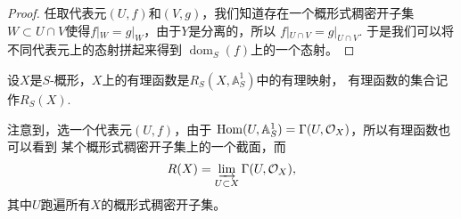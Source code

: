\begin{proof}
	任取代表元$(U,f)$和$(V,g)$，我们知道存在一个概形式稠密开子集
	$W\subset U\cap V$使得$f|_W=g|_W$，由于$Y$是分离的，所以
	$f|_{U\cap V}=g|_{U\cap V}$. 于是我们可以将不同代表元上的态射拼起来得到
	$\operatorname{dom}_S(f)$上的一个态射。
\end{proof}

\begin{para}[有理函数]
	设$X$是$S$-概形，$X$上的有理函数是$R_S(X,\mathbb A_{S}^1)$中的有理映射，
	有理函数的集合记作$R_S(X)$.
\end{para}

注意到，选一个代表元$(U,f)$，由于
$\operatorname{Hom}(U,\mathbb A_{S}^1)=\Gamma(U,\mathcal O_X)$，所以有理函数也可以看到
某个概形式稠密开子集上的一个截面，而 
\[
	R(X)=\varinjlim_{U\subset X} \Gamma(U,\mathcal O_X),
\]
其中$U$跑遍所有$X$的概形式稠密开子集。